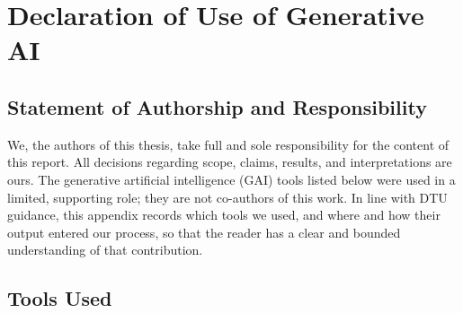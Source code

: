 
\chapter{Declaration of Use of Generative AI}
\label{app:ai-declaration}


\section{Statement of Authorship and Responsibility}

We, the authors of this thesis, take full and sole responsibility for the content of this report.
All decisions regarding scope, claims, results, and interpretations are ours.
The generative artificial intelligence (GAI) tools listed below were used in a limited, supporting role; they are not co-authors of this work.
In line with DTU guidance, this appendix records which tools we used, and where and how their output entered our process, so that the reader has a clear and bounded understanding of that contribution.

\section{Tools Used}


